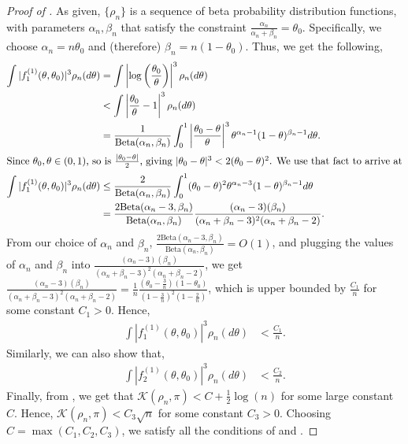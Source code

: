 \documentclass[11pt]{amsart}
\begin{document}
\begin{proof}[Proof of ]
As given, $\{\rho_n\}$ is a sequence of beta probability distribution functions, with parameters $\alpha_n, \beta_n$ that satisfy the constraint $\frac{\alpha_n}{\alpha_n+\beta_n}=\theta_0$. Specifically, we choose $\alpha_n = n\theta_0$ and (therefore) $\beta_n = n(1-\theta_0)$. Thus, we get the following,
%
\begin{align*}
    \int |f^{(1)}_1(\theta,\theta_0)|^3 \rho_n(d\theta) & = \int \left|\log\left(\frac{\theta_0}{\theta}\right)\right|^3 \rho_n(d\theta)\\
    & < \int \left|\frac{\theta_0}{\theta}-1\right|^3 \rho_n(d\theta)\\
    & = \frac{1}{\text{Beta}(\alpha_n,\beta_n)} \int_0^1 \left|\frac{ \theta_0-\theta } { \theta }\right|^{3} \theta^{\alpha_n-1} (1-\theta)^{\beta_n -1}d\theta.\\
    \intertext{Since $\theta_0,\theta\in (0,1)$, so is $\frac{|\theta_0-\theta|}{2}$, giving $|\theta_0-\theta|^3<2(\theta_0-\theta)^2$. We use that fact to arrive at}
    \int |f^{(1)}_1(\theta,\theta_0)|^3 \rho_n(d\theta) & \leq \frac{2}{\text{Beta}(\alpha_n,\beta_n)} \int_0^1 ( \theta_0-\theta)^2\theta^{\alpha_n-3} (1-\theta)^{\beta_n -1}d\theta\\
    & = \frac{2\text{Beta}(\alpha_n-3,\beta_n)}{\text{Beta}(\alpha_n,\beta_n)} \frac{(\alpha_n-3)(\beta_n)}{(\alpha_n+\beta_n-3)^2(\alpha_n+\beta_n-2)}.
\end{align*}
From our choice of $\alpha_n$ and $\beta_n$, $\frac{2\text{Beta}(\alpha_n-3,\beta_n)}{\text{Beta}(\alpha_n,\beta_n)}=O(1)$, and plugging the values of $\alpha_n$ and $\beta_n$ into $\frac{(\alpha_n-3)(\beta_n)}{(\alpha_n+\beta_n-3)^2(\alpha_n+\beta_n-2)}$, we get $\frac{(\alpha_n-3)(\beta_n)}{(\alpha_n+\beta_n-3)^2(\alpha_n+\beta_n-2)}=\frac{1}{n}\frac{(\theta_0-\frac{3}{n})(1-\theta_0)}{(1-\frac{3}{n})^2(1-\frac{2}{n})}$, which is upper bounded by $\frac{C_1}{n}$ for some constant $C_1>0$. Hence,
\begin{align*}
     \int |f^{(1)}_1(\theta,\theta_0)|^3 \rho_n(d\theta) & <\frac{C_1}{n}.
\end{align*}
Similarly, we can also show that,
\begin{align*}
     \int |f^{(1)}_2(\theta,\theta_0)|^3 \rho_n(d\theta) & < \frac{C_2}{n}.
\end{align*}
Finally, from , we get that $\mathcal{K}(\rho_n,\pi)<C+\frac{1}{2}\log(n)$ for some large constant $C$. Hence, $\mathcal{K}(\rho_n,\pi)<C_3\sqrt{n}$ for some constant $C_3>0$.
Choosing $C=\max(C_1,C_2,C_3)$, we satisfy all the conditions of  and . 
\end{proof}
\end{document}
